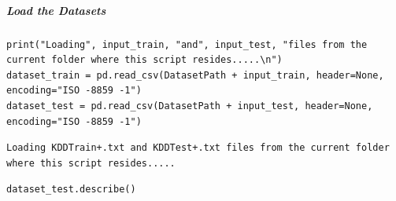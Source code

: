 \subparagraph{Load the Datasets}

\begin{verbatim}
print("Loading", input_train, "and", input_test, "files from the current folder where this script resides.....\n")
dataset_train = pd.read_csv(DatasetPath + input_train, header=None, encoding="ISO -8859 -1")
dataset_test = pd.read_csv(DatasetPath + input_test, header=None, encoding="ISO -8859 -1")
\end{verbatim}

\begin{verbatim}
Loading KDDTrain+.txt and KDDTest+.txt files from the current folder where this script resides.....
\end{verbatim}

\begin{verbatim}
dataset_test.describe()
\end{verbatim}

